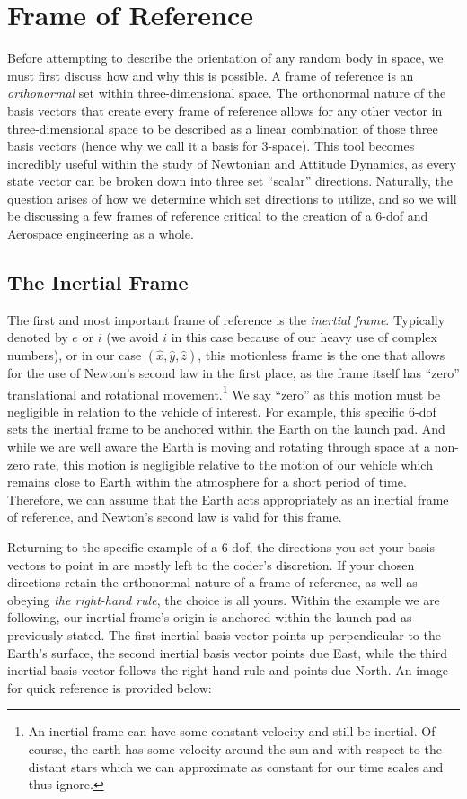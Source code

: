 \documentclass[12pt]{report}
\begin{document}
\section{Frame of Reference}\label{sec:Frame of Reference}
Before attempting to describe the orientation of any random body in space, we must first discuss how and why this is possible. A frame of reference is an \textit{orthonormal} set within three-dimensional space. The orthonormal nature of the basis vectors that create every frame of reference allows for any other vector in three-dimensional space to be described as a linear combination of those three basis vectors (hence why we call it a basis for 3-space). This tool becomes incredibly useful within the study of Newtonian and Attitude Dynamics, as every \gls{state vector} can be broken down into three set “scalar” directions. Naturally, the question arises of how we determine which set directions to utilize, and so we will be discussing a few frames of reference critical to the creation of a 6-\gls{dof} and Aerospace engineering as a whole.
\subsection{The Inertial Frame}
The first and most important frame of reference is the \textit{inertial frame}. Typically denoted by $e$ or $i$ (we avoid $i$ in this case because of our heavy use of complex numbers), or in our case $(\hat{x},\hat{y},\hat{z})$, this motionless frame is the one that allows for the use of Newton’s second law in the first place, as the frame itself has “zero” translational and rotational movement.\footnote{An inertial frame can have some constant velocity and still be inertial. Of course, the earth has some velocity around the sun and with respect to the distant stars which we can approximate as constant for our time scales and thus ignore.} We say “zero” as this motion must be negligible in relation to the vehicle of interest. For example, this specific 6-\gls{dof} sets the inertial frame to be anchored within the Earth on the launch pad. And while we are well aware the Earth is moving and rotating through space at a non-zero rate, this motion is negligible relative to the motion of our vehicle which remains close to Earth within the atmosphere for a short period of time. Therefore, we can assume that the Earth acts appropriately as an inertial frame of reference, and Newton’s second law is valid for this frame. 

Returning to the specific example of a 6-\gls{dof}, the directions you set your basis vectors to point in are mostly left to the coder’s discretion. If your chosen directions retain the orthonormal nature of a frame of reference, as well as obeying \textit{the right-hand rule}, the choice is all yours. Within the example we are following, our inertial frame’s origin is anchored within the launch pad as previously stated. The first inertial basis vector points up perpendicular to the Earth’s surface, the second inertial basis vector points due East, while the third inertial basis vector follows the right-hand rule and points due North. An image for quick reference is provided below:
\end{document}
